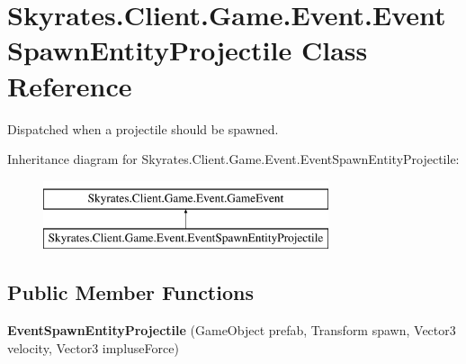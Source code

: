 \hypertarget{class_skyrates_1_1_client_1_1_game_1_1_event_1_1_event_spawn_entity_projectile}{\section{Skyrates.\-Client.\-Game.\-Event.\-Event\-Spawn\-Entity\-Projectile Class Reference}
\label{class_skyrates_1_1_client_1_1_game_1_1_event_1_1_event_spawn_entity_projectile}
}


Dispatched when a projectile should be spawned.  


Inheritance diagram for Skyrates.\-Client.\-Game.\-Event.\-Event\-Spawn\-Entity\-Projectile\-:\begin{figure}[H]
\begin{center}
\leavevmode
\includegraphics[height=2.000000cm]{class_skyrates_1_1_client_1_1_game_1_1_event_1_1_event_spawn_entity_projectile}
\end{center}
\end{figure}
\subsection*{Public Member Functions}
\begin{DoxyCompactItemize}
\item 
\hypertarget{class_skyrates_1_1_client_1_1_game_1_1_event_1_1_event_spawn_entity_projectile_a5f29002d1516ef4b512e08d46814104d}{{\bfseries Event\-Spawn\-Entity\-Projectile} (Game\-Object prefab, Transform spawn, Vector3 velocity, Vector3 impluse\-Force)}\label{class_skyrates_1_1_client_1_1_game_1_1_event_1_1_event_spawn_entity_projectile_a5f29002d1516ef4b512e08d46814104d}

\end{DoxyCompactItemize}
